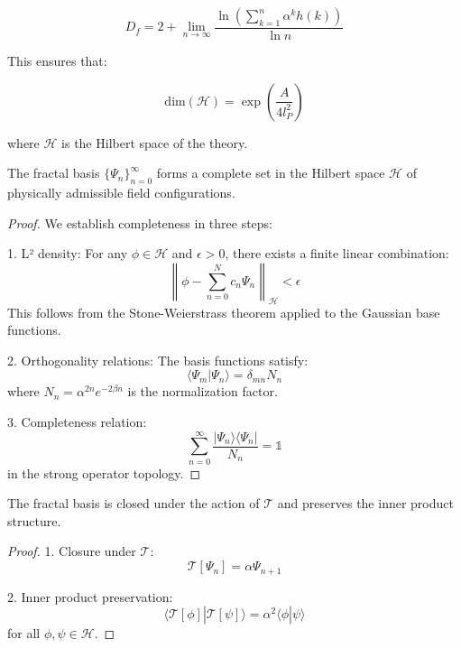 \documentclass{article}
\begin{document}
\begin{equation}
D_f = 2 + \lim_{n \to \infty} \frac{\ln\left(\sum_{k=1}^n \alpha^k h(k)\right)}{\ln n}
\end{equation}

This ensures that:

\begin{equation}
\text{dim}(\mathcal{H}) = \exp\left(\frac{A}{4l_P^2}\right)
\end{equation}

where $\mathcal{H}$ is the Hilbert space of the theory.

\begin{theorem}
The fractal basis $\{\Psi_n\}_{n=0}^{\infty}$ forms a complete set in the Hilbert space $\mathcal{H}$ of physically admissible field configurations.
\end{theorem}

\begin{proof}
We establish completeness in three steps:

1. L² density:
   For any $\phi \in \mathcal{H}$ and $\epsilon > 0$, there exists a finite linear combination:
   \[
   \left\|\phi - \sum_{n=0}^N c_n\Psi_n\right\|_{\mathcal{H}} < \epsilon
   \]
   This follows from the Stone-Weierstrass theorem applied to the Gaussian base functions.

2. Orthogonality relations:
   The basis functions satisfy:
   \[
   \langle\Psi_m|\Psi_n\rangle = \delta_{mn}N_n
   \]
   where $N_n = \alpha^{2n}e^{-2\beta n}$ is the normalization factor.

3. Completeness relation:
   \[
   \sum_{n=0}^{\infty} \frac{|\Psi_n\rangle\langle\Psi_n|}{N_n} = \mathbb{1}
   \]
   in the strong operator topology.
\end{proof}

\begin{theorem}
The fractal basis is closed under the action of $\mathcal{T}$ and preserves the inner product structure.
\end{theorem}

\begin{proof}
1. Closure under $\mathcal{T}$:
   \[
   \mathcal{T}[\Psi_n] = \alpha\Psi_{n+1}
   \]
   
2. Inner product preservation:
   \[
   \langle\mathcal{T}[\phi]|\mathcal{T}[\psi]\rangle = \alpha^2\langle\phi|\psi\rangle
   \]
   for all $\phi,\psi \in \mathcal{H}$.
\end{proof}
\end{document}
